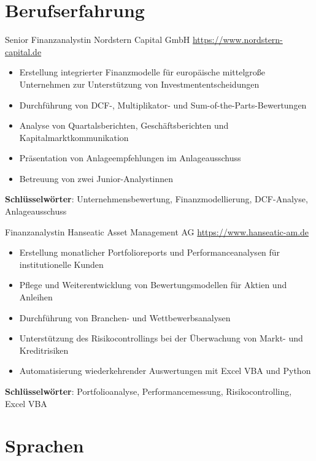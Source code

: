 \documentclass[a4paper, serif, 10pt]{moderncv}
\begin{document}
\section{Berufserfahrung}

        {Senior Finanzanalystin}
        {Nordstern Capital GmbH}
        {\url{https://www.nordstern-capital.de}}
        {}
        {\begin{itemize}
\item Erstellung integrierter Finanzmodelle für europäische mittelgroße Unternehmen zur Unterstützung von Investmententscheidungen
\item Durchführung von DCF-, Multiplikator- und Sum-of-the-Parts-Bewertungen
\item Analyse von Quartalsberichten, Geschäftsberichten und Kapitalmarktkommunikation
\item Präsentation von Anlageempfehlungen im Anlageausschuss
\item Betreuung von zwei Junior-Analystinnen
\end{itemize}
\textbf{Schlüsselwörter}: Unternehmensbewertung, Finanzmodellierung, DCF-Analyse, Anlageausschuss}

        {Finanzanalystin}
        {Hanseatic Asset Management AG}
        {\url{https://www.hanseatic-am.de}}
        {}
        {\begin{itemize}
\item Erstellung monatlicher Portfolioreports und Performanceanalysen für institutionelle Kunden
\item Pflege und Weiterentwicklung von Bewertungsmodellen für Aktien und Anleihen
\item Durchführung von Branchen- und Wettbewerbsanalysen
\item Unterstützung des Risikocontrollings bei der Überwachung von Markt- und Kreditrisiken
\item Automatisierung wiederkehrender Auswertungen mit Excel VBA und Python
\end{itemize}
\textbf{Schlüsselwörter}: Portfolioanalyse, Performancemessung, Risikocontrolling, Excel VBA}
\section{Sprachen}

\end{document}
